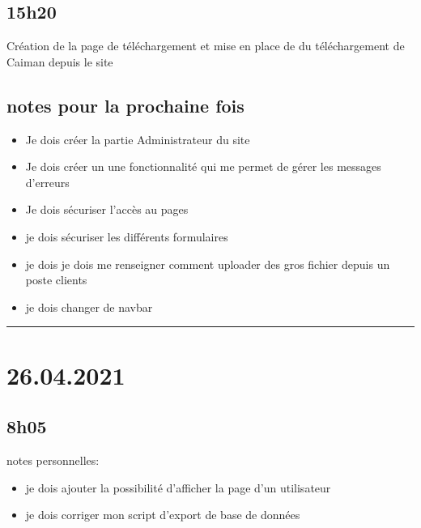 \documentclass[a4paper,12pt,french]{sphinxmanual}
\begin{document}
\subsection{15h20}
\label{\detokenize{logbook:id25}}
\sphinxAtStartPar
Création de la page de téléchargement et mise en place de du téléchargement de Caiman depuis le site


\subsection{notes pour la prochaine fois}
\label{\detokenize{logbook:notes-pour-la-prochaine-fois}}\begin{itemize}
\item {} 
\sphinxAtStartPar
Je dois créer la partie Administrateur du site

\item {} 
\sphinxAtStartPar
Je dois créer un une fonctionnalité qui me permet de gérer les messages d’erreurs

\item {} 
\sphinxAtStartPar
Je dois sécuriser l’accès au pages

\item {} 
\sphinxAtStartPar
je dois sécuriser les différents formulaires

\item {} 
\sphinxAtStartPar
je dois je dois me renseigner comment uploader des gros fichier depuis un poste clients

\item {} 
\sphinxAtStartPar
je dois changer de navbar

\end{itemize}


\bigskip\hrule\bigskip



\section{26.04.2021}
\label{\detokenize{logbook:id26}}

\subsection{8h05}
\label{\detokenize{logbook:id27}}
\sphinxAtStartPar
notes personnelles:
\begin{itemize}
\item {} 
\sphinxAtStartPar
je dois ajouter la possibilité d’afficher la page d’un utilisateur

\item {} 
\sphinxAtStartPar
je dois corriger mon script d’export de base de données

\end{itemize}
\end{document}
